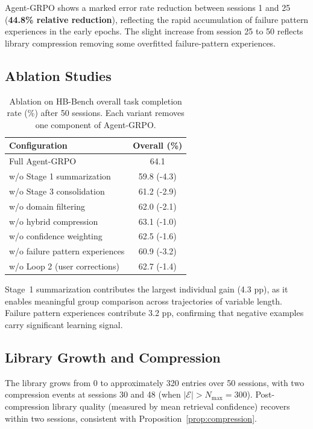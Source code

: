 \documentclass[11pt]{article}
\begin{document}
Agent-GRPO shows a marked error rate reduction between sessions 1 and 25
(\textbf{44.8\% relative reduction}), reflecting the rapid accumulation of
failure pattern experiences in the early epochs. The slight increase from
session 25 to 50 reflects library compression removing some overfitted
failure-pattern experiences.

\subsection{Ablation Studies}

\begin{table}[H]
\centering
\caption{Ablation on HB-Bench overall task completion rate (\%) after 50 sessions.
Each variant removes one component of Agent-GRPO.}
\label{tab:ablation}
\begin{tabular}{lc}
\toprule
\textbf{Configuration} & \textbf{Overall (\%)} \\
\midrule
Full Agent-GRPO                       & 64.1 \\
\quad w/o Stage 1 summarization       & 59.8 (-4.3) \\
\quad w/o Stage 3 consolidation       & 61.2 (-2.9) \\
\quad w/o domain filtering            & 62.0 (-2.1) \\
\quad w/o hybrid compression          & 63.1 (-1.0) \\
\quad w/o confidence weighting        & 62.5 (-1.6) \\
\quad w/o failure pattern experiences & 60.9 (-3.2) \\
\quad w/o Loop 2 (user corrections)   & 62.7 (-1.4) \\
\bottomrule
\end{tabular}
\end{table}

Stage~1 summarization contributes the largest individual gain (4.3 pp), as
it enables meaningful group comparison across trajectories of variable length.
Failure pattern experiences contribute 3.2 pp, confirming that negative
examples carry significant learning signal.

\subsection{Library Growth and Compression}

The library grows from 0 to approximately 320 entries over 50 sessions, with
two compression events at sessions 30 and 48 (when $|\mathcal{E}| > N_{\max} = 300$).
Post-compression library quality (measured by mean retrieval confidence)
recovers within two sessions, consistent with Proposition~\ref{prop:compression}.
\end{document}
